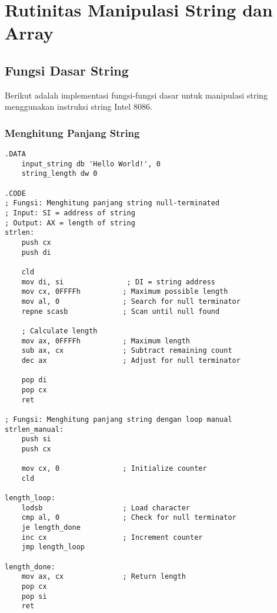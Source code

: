 \documentclass[../main.tex]{subfiles}
\begin{document}
    \section{Rutinitas Manipulasi String dan Array}
        \subsection{Fungsi Dasar String}
            Berikut adalah implementasi fungsi-fungsi dasar untuk manipulasi string menggunakan instruksi string Intel 8086.

            \subsubsection{Menghitung Panjang String}
                \begin{lstlisting}[language={[x86masm]Assembler}, caption=Menghitung Panjang String, label={lst:string-length}]
.DATA
    input_string db 'Hello World!', 0
    string_length dw 0

.CODE
; Fungsi: Menghitung panjang string null-terminated
; Input: SI = address of string
; Output: AX = length of string
strlen:
    push cx
    push di
    
    cld
    mov di, si               ; DI = string address
    mov cx, 0FFFFh          ; Maximum possible length
    mov al, 0               ; Search for null terminator
    repne scasb             ; Scan until null found
    
    ; Calculate length
    mov ax, 0FFFFh          ; Maximum length
    sub ax, cx              ; Subtract remaining count
    dec ax                  ; Adjust for null terminator
    
    pop di
    pop cx
    ret

; Fungsi: Menghitung panjang string dengan loop manual
strlen_manual:
    push si
    push cx
    
    mov cx, 0               ; Initialize counter
    cld
    
length_loop:
    lodsb                   ; Load character
    cmp al, 0               ; Check for null terminator
    je length_done
    inc cx                  ; Increment counter
    jmp length_loop
    
length_done:
    mov ax, cx              ; Return length
    pop cx
    pop si
    ret
                \end{lstlisting}
\end{document}
